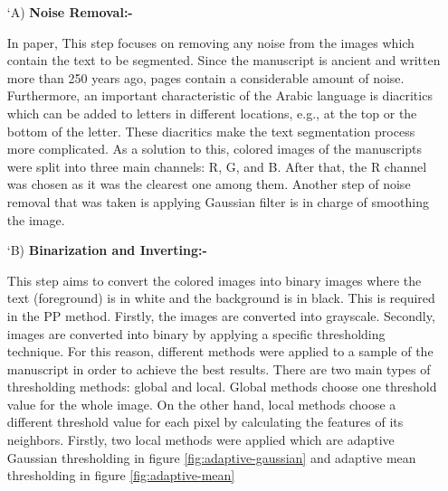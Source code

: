 \begin{itemize}[labelindent=1em,labelsep=0.25cm,leftmargin=*]
        \item[\char `A)] \textbf{Noise Removal:-}
       
        In paper, \cite{Shams2020} This step focuses on removing any noise from the images
        which contain the text to be segmented. 
        Since the manuscript is ancient and written more than 250
        years ago, pages contain a considerable amount of noise.
        Furthermore, an important characteristic of the Arabic language is
        diacritics which can be added to letters in different locations,
        e.g., at the top or the bottom of the letter. These diacritics make
        the text segmentation process more complicated. As a solution
        to this, colored images of the manuscripts were split into three
        main channels: R, G, and B. After that, the R channel was
        chosen as it was the clearest one among them.
        Another step of noise removal that was taken is applying
        Gaussian filter is in charge of smoothing the image.
        \item[\char `B)] \textbf{Binarization and Inverting:-}
        
        This step aims to convert the colored images into binary
        images where the text (foreground) is in white and the background is in black. This is required in the PP method.
        Firstly, the images are converted into grayscale. Secondly,
        images are converted into binary by applying a specific
        thresholding technique. For this reason, different methods were
        applied to a sample of the manuscript in order to achieve the
        best results. There are two main types of thresholding methods: global and local. Global methods choose one threshold value for the whole image. On the other hand, local methods choose
        a different threshold value for each pixel by calculating the
        features of its neighbors. Firstly, two local methods were
        applied which are adaptive Gaussian thresholding in 
        figure \ref{fig:adaptive-gaussian} and adaptive mean thresholding in figure \ref{fig:adaptive-mean} 
        

\end{itemize}
